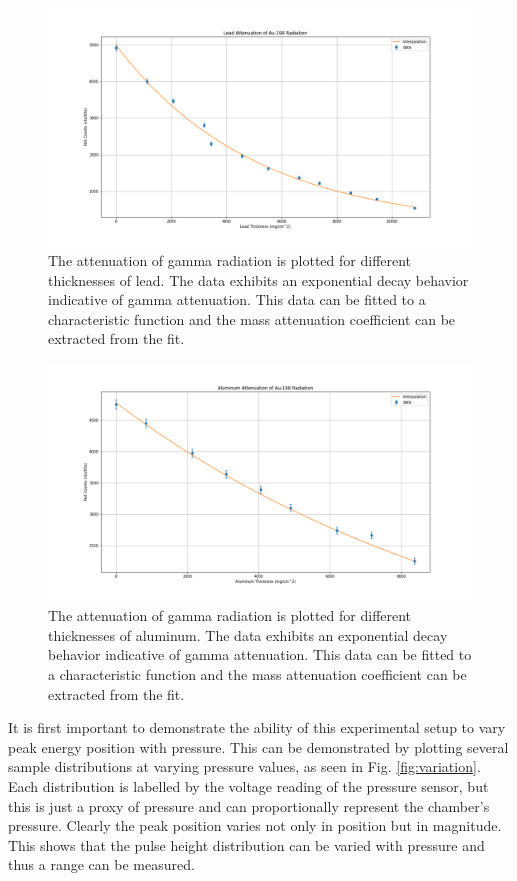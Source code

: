 \begin{figure}
\centering
\includegraphics[width=\textwidth]{Pb.png}
\caption{The attenuation of gamma radiation is plotted for different thicknesses of lead. The data exhibits an exponential decay behavior indicative of gamma attenuation. This data can be fitted to a characteristic function and the mass attenuation coefficient can be extracted from the fit.}
\label{fig:Pb}
\end{figure}

\begin{figure}
\centering
\includegraphics[width=\textwidth]{Al.png}
\caption{The attenuation of gamma radiation is plotted for different thicknesses of aluminum. The data exhibits an exponential decay behavior indicative of gamma attenuation. This data can be fitted to a characteristic function and the mass attenuation coefficient can be extracted from the fit.}
\label{fig:Al}
\end{figure}

It is first important to demonstrate the ability of this experimental setup to vary peak energy position with pressure. This can be demonstrated by plotting several sample distributions at varying pressure values, as seen in Fig. \ref{fig:variation}. Each distribution is labelled by the voltage reading of the pressure sensor, but this is just a proxy of pressure and can proportionally represent the chamber’s pressure. Clearly the peak position varies not only in position but in magnitude. This shows that the pulse height distribution can be varied with pressure and thus a range can be measured.

